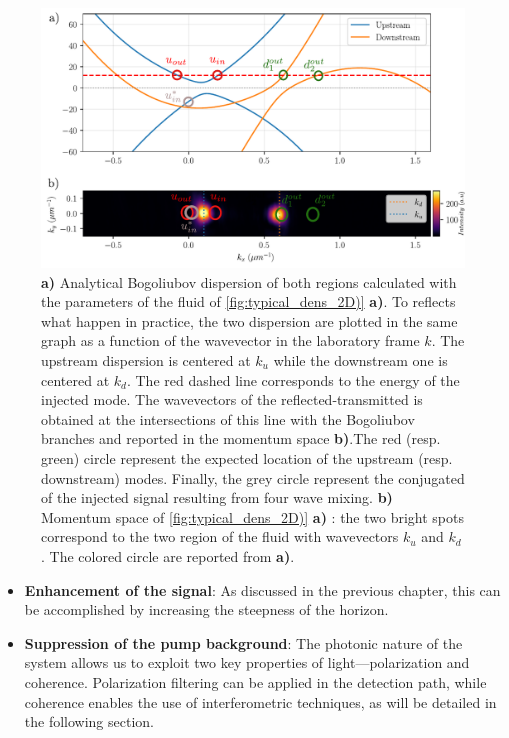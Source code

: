 \begin{figure}
    \centering
    \includegraphics[width=1\textwidth]{chap_stimulated_hawking/fig/bh_k_space.pdf}
    \caption{\textbf{a)} Analytical Bogoliubov dispersion of both regions calculated with the parameters of the fluid of \autoref{fig:typical_dens_2D)} \textbf{a)}. To reflects what happen in practice, the two dispersion are plotted in the same graph as a function of the wavevector in the laboratory frame $k$. The upstream dispersion
    is centered at $k_u$ while the downstream one is centered at $k_d$. The red dashed line corresponds to the energy of the injected mode. The wavevectors of the reflected-transmitted is obtained 
    at the intersections of this line with the Bogoliubov branches and reported in the momentum space \textbf{b)}.The red (resp. green) circle represent the expected location 
    of the upstream (resp. downstream) modes. Finally, the grey circle represent the conjugated of the injected signal resulting from four wave mixing. \textbf{b)} Momentum space of \autoref{fig:typical_dens_2D)} \textbf{a)} : the two bright spots correspond to the two region of the fluid with wavevectors $k_u$ and $k_d$. The colored circle
    are reported from \textbf{a)}.}
    \label{fig:bh_k_space}
\end{figure}

\begin{itemize}
    \item \textbf{Enhancement of the signal}: As discussed in the previous chapter, this can be accomplished by increasing the steepness of the horizon.
    \item \textbf{Suppression of the pump background}: The photonic nature of the system allows us to exploit two key properties of light—polarization and coherence. Polarization filtering can be applied in the detection path, while coherence enables the use of interferometric techniques, as will be detailed in the following section.
\end{itemize}

